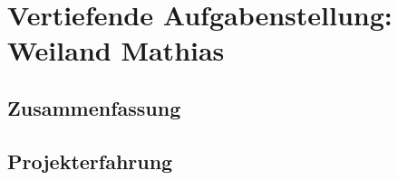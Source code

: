 \chapter[Weiland]{Vertiefende Aufgabenstellung: Weiland Mathias}

\section{Zusammenfassung}

\section{Projekterfahrung}